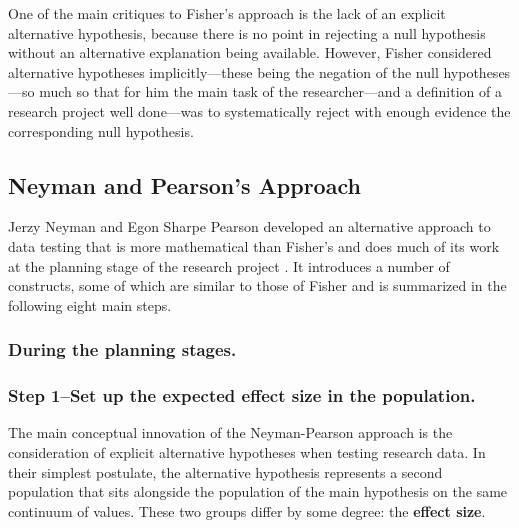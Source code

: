 \documentclass[
]{book}
\theoremstyle{definition}
\theoremstyle{definition}
\theoremstyle{definition}
\theoremstyle{definition}
\theoremstyle{remark}
\begin{document}
One of the main critiques to Fisher's approach is the lack of an explicit alternative hypothesis, because there is no point in rejecting a null hypothesis without an alternative explanation being available. However, Fisher considered alternative hypotheses implicitly---these being the negation of the null hypotheses---so much so that for him the main task of the researcher---and a definition of a research project well done---was to systematically reject with enough evidence the corresponding null hypothesis.

\hypertarget{neyman-and-pearsons-approach}{%
\subsection{Neyman and Pearson's Approach}\label{neyman-and-pearsons-approach}}

Jerzy Neyman and Egon Sharpe Pearson developed an alternative approach to data testing that is more mathematical than Fisher's and does much of its work at the planning stage of the research project \citep{Macdonald1997}. It introduces a number of constructs, some of which are similar to those of Fisher and is summarized in the following eight main steps.

\hypertarget{during-the-planning-stages.}{%
\subsubsection*{During the planning stages.}\label{during-the-planning-stages.}}

\hypertarget{step-1set-up-the-expected-effect-size-in-the-population.}{%
\subsubsection*{Step 1--Set up the expected effect size in the population.}\label{step-1set-up-the-expected-effect-size-in-the-population.}}

The main conceptual innovation of the Neyman-Pearson approach is the consideration of explicit alternative hypotheses when testing research data. In their simplest postulate, the alternative hypothesis represents a second population that sits alongside the population of the main hypothesis on the same continuum of values. These two groups differ by some degree: the \textbf{effect size}.
\end{document}
